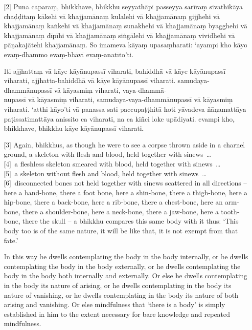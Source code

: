 [2] Puna caparaṃ, bhikkhave, bhikkhu seyyathāpi passeyya sarīraṃ sivathikāya
chaḍḍitaṃ kākehi vā khajjamānaṃ kulalehi vā khajjamānaṃ gijjhehi vā khajjamānaṃ
kaṅkehi vā khajjamānaṃ sunakhehi vā khajjamānaṃ byagghehi vā khajjamānaṃ dīpīhi
vā khajjamānaṃ siṅgālehi vā khajjamānaṃ vividhehi vā pāṇakajātehi khajjamānaṃ.
So imameva kāyaṃ upasaṃharati: ‘ayampi kho kāyo evaṃ-dhammo evaṃ-bhāvī
evaṃ-anatīto’ti.

Iti ajjhattaṃ vā kāye kāyānupassī viharati, bahiddhā vā kāye kāyānupassī
viharati, ajjhatta-bahiddhā vā kāye kāyānupassī viharati. samudaya-dhammānupassī
vā kāyasmiṃ viharati, vaya-dhammā-\\
nupassī vā kāyasmiṃ viharati, samudaya-vaya-dhammānupassī vā kāyasmiṃ viharati.
‘atthi kāyo’ti vā panassa sati paccupaṭṭhitā hoti yāvadeva ñāṇamattāya
paṭissatimattāya anissito ca viharati, na ca kiñci loke upādiyati. evampi kho,
bhikkhave, bhikkhu kāye kāyānupassī viharati.

\englishPage

[3] Again, bhikkhus, as though he were to see a corpse thrown aside in a
charnel ground, a skeleton with flesh and blood, held together with sinews~\ldots{}\\
{}[4]~a fleshless skeleton smeared with blood, held together with sinews~\ldots{}\\
{}[5]~a skeleton without flesh and blood, held together with sinews~\ldots{}\\
{}[6]~disconnected bones not held together with sinews scattered in all directions
-- here a hand-bone, there a foot bone, here a shin-bone, there a thigh-bone,
here a hip-bone, there a back-bone, here a rib-bone, there a chest-bone, here an
arm-bone, there a shoulder-bone, here a neck-bone, there a jaw-bone, here a
tooth-bone, there the skull -- a bhikkhu compares this same body with it thus:
`This body too is of the same nature, it will be like that, it is not exempt
from that fate.'

In this way he dwells contemplating the body in the body internally, or he
dwells contemplating the body in the body externally, or he dwells contemplating
the body in the body both internally and externally. Or else he dwells
contemplating in the body its nature of arising, or he dwells contemplating in
the body its nature of vanishing, or he dwells contemplating in the body its
nature of both arising and vanishing. Or else mindfulness that ‘there is a body’
is simply established in him to the extent necessary for bare knowledge and
repeated mindfulness.

